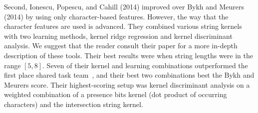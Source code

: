 Second, Ionescu, Popescu, and Cahill (2014) improved over Bykh and Meurers
(2014) by using only
character-based features. However, the way that the character features are used
is advanced. They combined various string kernels with two learning methods,
kernel ridge regression and kernel discriminant analysis. We suggest that the
reader consult their paper for a more in-depth description of these tools. Their
best results were when string lengths were in the range $[5,8]$. Seven of their
kernel and learning combinations outperformed the first place shared task
team~\cite{jarvis}, and their best two combinations best the Bykh and Meurers
score. Their highest-scoring setup was kernel discriminant analysis on a
weighted combination of a presence bits kernel (dot product of occurring
characters) and the intersection string kernel.
